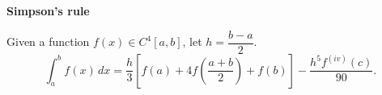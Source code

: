 \documentclass[12pt,letterpaper,noanswers]{exam}
\begin{document}
    
\vspace{0.5in}

    
    
\begin{tcolorbox}
\noindent\textbf{Simpson's rule}

Given a function $f(x) \in C^4[a,b]$, let $h = \dfrac{b-a}{2}$.
\[
          \int_{a}^{b} f(x) \, dx = \frac{h}{3}\left[ f(a)+4f\left(\dfrac{a+b}{2}\right) + f(b) \right]
          - \frac{h^5f^{(iv)}(c)}{90}.\]
\end{tcolorbox}
\end{document}
